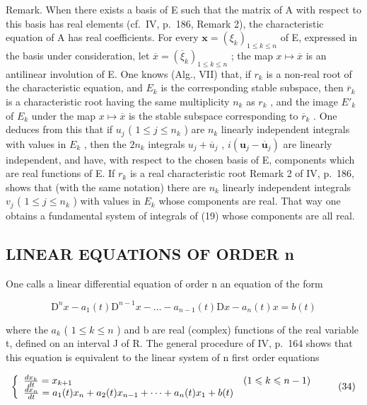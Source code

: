 Remark. When there exists a basis of E such that the matrix of A with respect to this basis has real elements (cf.~IV, p.~186, Remark 2), the characteristic equation of A has real coefficients. For every \(\mathbf{x} = (\xi_k)_{1 \leqslant k \leqslant n}\) of E, expressed in the basis under consideration, let \(\overline{x} = (\overline{\xi}_k)_{1 \leqslant k \leqslant n}\) ; the map \(x \mapsto \overline{x}\) is an antilinear involution of E. One knows (Alg., VII) that, if \(r_k\) is a non-real root of the characteristic equation, and \(E_k\) is the corresponding stable subspace, then \(\overline{r}_k\) is a characteristic root having the same multiplicity \(n_k\) as \(r_k\) , and the image \(E'_k\) of \(E_k\) under the map \(x \mapsto \overline{x}\) is the stable subspace corresponding to \(\overline{r}_k\) . One deduces from this that if \(u_j\) ( \(1 \leqslant j \leqslant n_k\) ) are \(n_k\) linearly independent integrals with values in \(E_k\) , then the \(2n_k\) integrals \(u_j + \overline{u}_j\) , \(i(\mathbf{u}_j - \overline{\mathbf{u}}_j)\) are linearly independent, and have, with respect to the chosen basis of E, components which are real functions of E. If \(r_k\) is a real characteristic root Remark 2 of IV, p.~186, shows that (with the same notation) there are \(n_k\) linearly independent integrals \(v_j\) ( \(1 \leqslant j \leqslant n_k\) ) with values in \(E_k\) whose components are real. That way one obtains a fundamental system of integrals of (19) whose components are all real.

\subsection{LINEAR EQUATIONS OF ORDER n}

One calls a linear differential equation of order n an equation of the form

\[
\mathrm{D} ^ {n} x - a _ {1} (t) \mathrm{D} ^ {n - 1} x - \dots - a _ {n - 1} (t) \mathrm{D} x - a _ {n} (t) x = b (t)\tag{33}
\]

where the \(a_{k}\) ( \(1 \leqslant k \leqslant n\) ) and b are real (complex) functions of the real variable t, defined on an interval J of R. The general procedure of IV, p.~164 shows that this equation is equivalent to the linear system of n first order equations

\[
\left\{ \begin{array}{l l} \frac {d x _ {k}}{d t} = x _ {k + 1} & (1 \leqslant k \leqslant n - 1) \\ \frac {d x _ {n}}{d t} = a _ {1} (t) x _ {n} + a _ {2} (t) x _ {n - 1} + \dots + a _ {n} (t) x _ {1} + b (t) \end{array} \right.\tag{34}
\]

